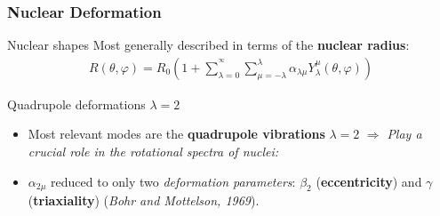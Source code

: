 \documentclass{beamer}
\begin{document}
\begin{frame}
	\frametitle{Nuclear Deformation}
	\begin{exampleblock}{Nuclear shapes}
		Most generally described in terms of the \textbf{nuclear radius}:
		\begin{align}
			R(\theta,\varphi)=R_0\left(1+\sum_{\lambda=0}^{^\infty}\sum_{\mu=-\lambda}^\lambda\alpha_{\lambda\mu}Y_\lambda^\mu(\theta,\varphi)\right)\nonumber
		\end{align}
	\end{exampleblock}
	\begin{block}{Quadrupole deformations $\lambda=2$}

		\begin{itemize}
			\item Most relevant modes are the \textbf{quadrupole vibrations} $\lambda=2$ $\Longrightarrow$ \emph{Play a crucial role in the rotational spectra of nuclei:}
			\item $\alpha_{2\mu}$ reduced to only two \emph{deformation parameters}: $\beta_2$ (\textbf{eccentricity}) and $\gamma$ (\textbf{triaxiality}) (\textit{Bohr and Mottelson, 1969}).
		\end{itemize}
	\end{block}
\end{frame}
\end{document}
